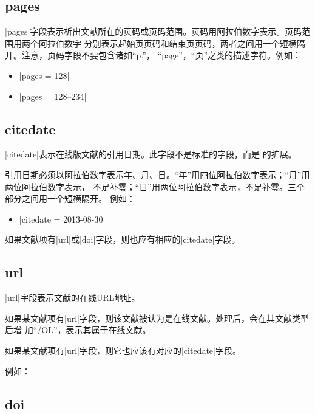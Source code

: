 \subsection{pages}\label{subsec:bibfield-pages}

|pages|字段表示析出文献所在的页码或页码范围。页码用阿拉伯数字表示。页码范围用两个阿拉伯数字
分别表示起始页页码和结束页页码，两者之间用一个短横隔开。注意，页码字段不要包含诸如``p.''，
``page''，``页''之类的描述字符。例如：
\begin{itemize}
\item |pages = {128}|
\item |pages = {128--234}|
\end{itemize}

\subsection{citedate}\label{subsec:bibfield-citedate}

|citedate|表示在线版文献的引用日期。此字段不是标准的{\BibTeX}字段，而是{\njuthesis}
的扩展。

引用日期必须以阿拉伯数字表示年、月、日。“年”用四位阿拉伯数字表示；“月”用两位阿拉伯数字表示，
不足补零；“日”用两位阿拉伯数字表示，不足补零。三个部分之间用一个短横隔开。
例如：
\begin{itemize}
\item |citedate = {2013-08-30}|
\end{itemize}

如果文献项有|url|或|doi|字段，则也应有相应的|citedate|字段。

\subsection{url}\label{subsec:bibfield-url}

|url|字段表示文献的在线URL地址。

如果某文献项有|url|字段，则该文献被认为是在线文献。{\BibTeX}处理后，会在其文献类型后增
加``/OL''，表示其属于在线文献。

如果某文献项有|url|字段，则它也应该有对应的|citedate|字段。

例如：

\subsection{doi}\label{subsec:bibfield-doi}

